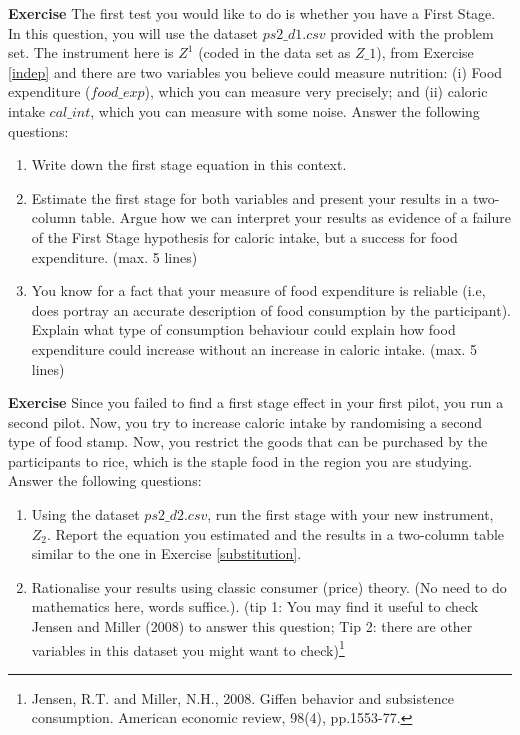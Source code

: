 \documentclass[10pt]{article}
\newcounter{exercise}
\newenvironment{exercise}%
{%
	\refstepcounter{exercise}%
	\textbf{Exercise \theexercise}%
	}%
{
 \par\vspace{\baselineskip}%
\noindent\ignorespacesafterend
}
\begin{document}

\begin{exercise}\label{substitution}
	The first test you would like to do is whether you have a First Stage. In this question, you will use the dataset $ps2\_d1.csv$ provided with the problem set. The instrument here is $ Z^1 $ (coded in the data set as $ Z\_1 $), from Exercise \ref{indep} and there are two variables you believe could measure nutrition: (i) Food expenditure ($ food\_exp $), which you can measure very precisely; and (ii) caloric intake $ cal\_int $, which you can measure with some noise. Answer the following questions:
	\begin{enumerate}
		\item Write down the first stage equation in this context.
		\item Estimate the first stage for both variables and present your results in a two-column table. Argue how we can interpret your results as evidence of a failure of the First Stage hypothesis for caloric intake, but a success for food expenditure. (max. 5 lines)
		\item You know for a fact that your measure of food expenditure is reliable (i.e, does portray an accurate description of food consumption by the participant). Explain what type of consumption behaviour could explain how food expenditure could increase without an increase in caloric intake. (max. 5 lines)

		
	\end{enumerate}
	
\end{exercise}


\begin{exercise}\label{giffen}
	Since you failed to find a first stage effect in your first pilot, you run a second pilot. Now, you try to increase caloric intake by randomising a second type of food stamp. Now, you restrict the goods that can be purchased by the participants to rice, which is the staple food in the region you are studying. Answer the following questions:
	\begin{enumerate}
		\item Using the dataset $ps2\_d2.csv$, run the first stage with your new instrument, $ Z_{2} $. Report the equation you estimated and the results in a two-column table similar to the one in Exercise \ref{substitution}. 
		
		\item Rationalise your results using classic consumer (price) theory. (No need to do mathematics here, words suffice.). (tip 1: You may find it useful to check Jensen and Miller (2008) to answer this question; Tip 2: there are other variables in this dataset you might want to check)\footnote{Jensen, R.T. and Miller, N.H., 2008. Giffen behavior and subsistence consumption. American economic review, 98(4), pp.1553-77.}
	\end{enumerate}
	
\end{exercise}
\end{document}
